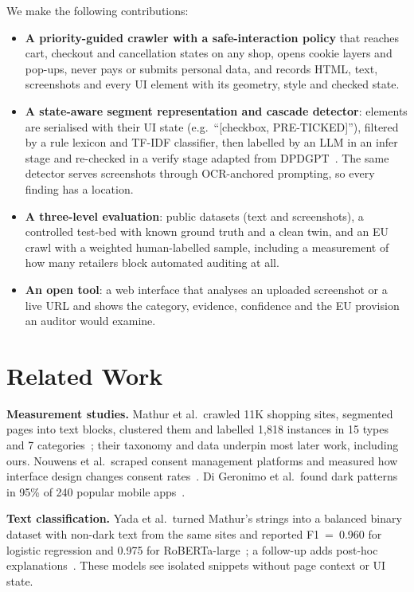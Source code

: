 \documentclass[conference]{IEEEtran}
\begin{document}
We make the following contributions:
\begin{itemize}
\item \textbf{A priority-guided crawler with a safe-interaction policy} that reaches cart, checkout and
cancellation states on any shop, opens cookie layers and pop-ups, never pays or submits personal data,
and records HTML, text, screenshots and every UI element with its geometry, style and checked state.
\item \textbf{A state-aware segment representation and cascade detector}: elements are serialised with their
UI state (e.g.\ ``[checkbox, PRE-TICKED]''), filtered by a rule lexicon and TF-IDF classifier, then labelled
by an LLM in an infer stage and re-checked in a verify stage adapted from DPDGPT~\cite{lin2026dpdgpt}.
The same detector serves screenshots through OCR-anchored prompting, so every finding has a location.
\item \textbf{A three-level evaluation}: public datasets (text and screenshots), a controlled test-bed with
known ground truth and a clean twin, and an EU crawl with a weighted human-labelled sample, including a
measurement of how many retailers block automated auditing at all.
\item \textbf{An open tool}: a web interface that analyses an uploaded screenshot or a live URL and shows
the category, evidence, confidence and the EU provision an auditor would examine.
\end{itemize}

\section{Related Work}
\textbf{Measurement studies.} Mathur et al.\ crawled 11K shopping sites, segmented pages into text blocks,
clustered them and labelled 1{,}818 instances in 15 types and 7 categories~\cite{mathur2019}; their
taxonomy and data underpin most later work, including ours. Nouwens et al.\ scraped consent
management platforms and measured how interface design changes consent rates~\cite{nouwens2020}. Di
Geronimo et al.\ found dark patterns in 95\% of 240 popular mobile apps~\cite{digeronimo2020}.

\textbf{Text classification.} Yada et al.\ turned Mathur's strings into a balanced binary dataset with
non-dark text from the same sites and reported F1~=~0.960 for logistic regression and 0.975 for
RoBERTa-large~\cite{yada2022}; a follow-up adds post-hoc explanations~\cite{yada2024}. These models see
isolated snippets without page context or UI state.
\end{document}
